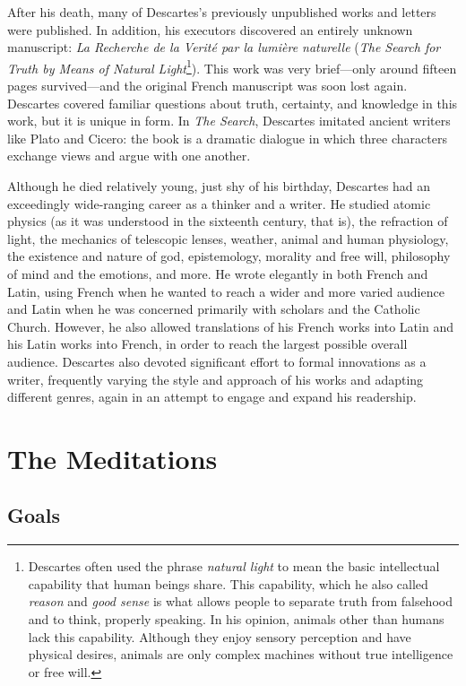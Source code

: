 After his death, many of Descartes's previously unpublished works and letters were published. In addition, his executors discovered an entirely unknown manuscript: \textit{La Recherche de la Verité par la lumière naturelle} (\textit{The Search for Truth by Means of Natural Light}\footnote{Descartes often used the phrase \textit{natural light} to mean the basic intellectual capability that human beings share. This capability, which he also called \textit{reason} and \textit{good sense} is what allows people to separate truth from falsehood and to think, properly speaking. In his opinion, animals other than humans lack this capability. Although they enjoy sensory perception and have physical desires, animals are only complex machines without true intelligence or free will.}). This work was very brief---only around fifteen pages survived---and the original French manuscript was soon lost again. Descartes covered familiar questions about truth, certainty, and knowledge in this work, but it is unique in form. In \textit{The Search}, Descartes imitated ancient writers like Plato and Cicero: the book is a dramatic dialogue in which three characters exchange views and argue with one another.

Although he died relatively young, just shy of his  birthday, Descartes had an exceedingly wide-ranging career as a thinker and a writer. He studied atomic physics (as it was understood in the sixteenth century, that is), the refraction of light, the mechanics of telescopic lenses, weather, animal and human physiology, the existence and nature of god, epistemology, morality and free will, philosophy of mind and the emotions, and more. He wrote elegantly in both French and Latin, using French when he wanted to reach a wider and more varied audience and Latin when he was concerned primarily with scholars and the Catholic Church. However, he also allowed translations of his French works into Latin and his Latin works into French, in order to reach the largest possible overall audience. Descartes also devoted significant effort to formal innovations as a writer, frequently varying the style and approach of his works and adapting different genres, again in an attempt to engage and expand his readership.

\section*{The Meditations}

\subsection*{Goals}

